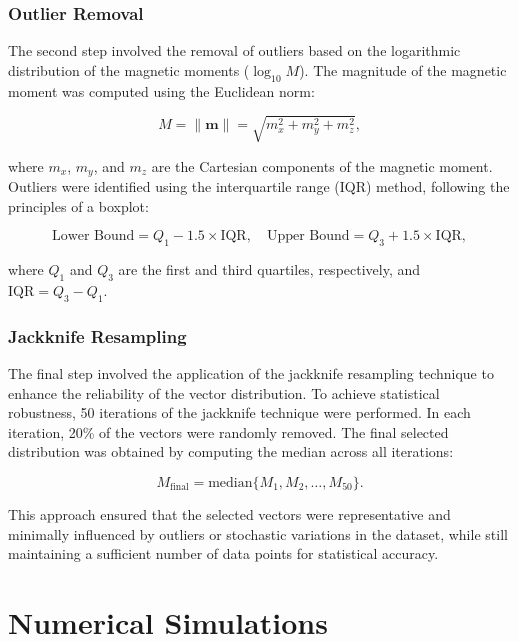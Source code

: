 \subsubsection{Outlier Removal}

The second step involved the removal of outliers based on the logarithmic distribution of the magnetic moments ($\log_{10} M$). The magnitude of the magnetic moment was computed using the Euclidean norm:

\begin{equation}
    M = \| \mathbf{m} \| = \sqrt{m_x^2 + m_y^2 + m_z^2},
\end{equation}

where $m_x$, $m_y$, and $m_z$ are the Cartesian components of the magnetic moment. Outliers were identified using the interquartile range (IQR) method, following the principles of a boxplot:

\begin{equation}
    \text{Lower Bound} = Q_1 - 1.5 \times \text{IQR}, \quad \text{Upper Bound} = Q_3 + 1.5 \times \text{IQR},
\end{equation}

where $Q_1$ and $Q_3$ are the first and third quartiles, respectively, and $\text{IQR} = Q_3 - Q_1$.

\subsubsection{Jackknife Resampling}

The final step involved the application of the jackknife resampling technique to enhance the reliability of the vector distribution. To achieve statistical robustness, 50 iterations of the jackknife technique were performed. In each iteration, 20\% of the vectors were randomly removed. The final selected distribution was obtained by computing the median across all iterations:

\begin{equation}
    M_{\text{final}} = \text{median} \{ M_1, M_2, \dots, M_{50} \}.
\end{equation}

This approach ensured that the selected vectors were representative and minimally influenced by outliers or stochastic variations in the dataset, while still maintaining a sufficient number of data points for statistical accuracy.

\section{Numerical Simulations}

